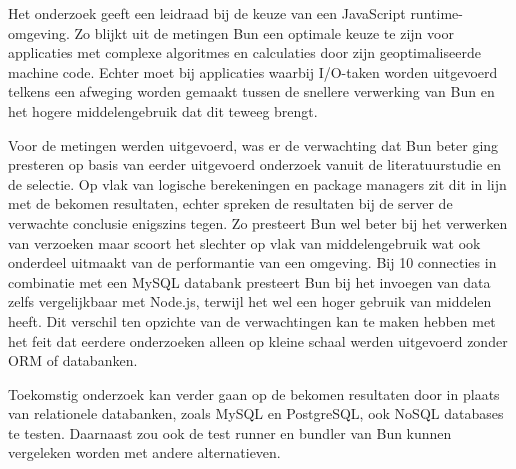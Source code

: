Het onderzoek geeft een leidraad bij de keuze van een JavaScript runtime-omgeving.
Zo blijkt uit de metingen Bun een optimale keuze te zijn voor applicaties met complexe algoritmes en calculaties door zijn geoptimaliseerde machine code.
Echter moet bij applicaties waarbij I/O-taken worden uitgevoerd telkens een afweging worden gemaakt tussen de snellere verwerking van Bun en het hogere middelengebruik dat dit teweeg brengt.


Voor de metingen werden uitgevoerd, was er de verwachting dat Bun beter ging presteren op basis van eerder uitgevoerd onderzoek vanuit de literatuurstudie en de selectie.
Op vlak van logische berekeningen en package managers zit dit in lijn met de bekomen resultaten, echter spreken de resultaten bij de server de verwachte conclusie enigszins tegen.
Zo presteert Bun wel beter bij het verwerken van verzoeken maar scoort het slechter op vlak van middelengebruik wat ook onderdeel uitmaakt van de performantie van een omgeving.
Bij 10 connecties in combinatie met een MySQL databank presteert Bun bij het invoegen van data zelfs vergelijkbaar met Node.js, 
terwijl het wel een hoger gebruik van middelen heeft.
Dit verschil ten opzichte van de verwachtingen kan te maken hebben met het feit dat eerdere onderzoeken alleen op kleine schaal werden uitgevoerd zonder ORM of databanken.

Toekomstig onderzoek kan verder gaan op de bekomen resultaten door in plaats van relationele databanken, zoals MySQL en PostgreSQL, ook NoSQL databases te testen.
Daarnaast zou ook de test runner en bundler van Bun kunnen vergeleken worden met andere alternatieven.

